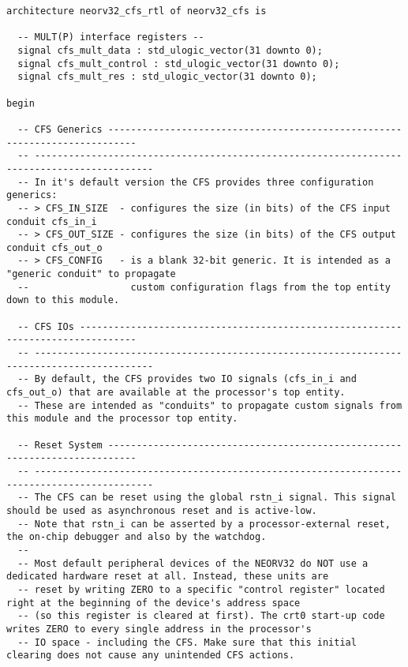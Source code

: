 \begin{code}
\begin{verbatim}
architecture neorv32_cfs_rtl of neorv32_cfs is

  -- MULT(P) interface registers --
  signal cfs_mult_data : std_ulogic_vector(31 downto 0);
  signal cfs_mult_control : std_ulogic_vector(31 downto 0);
  signal cfs_mult_res : std_ulogic_vector(31 downto 0);

begin

  -- CFS Generics ---------------------------------------------------------------------------
  -- -------------------------------------------------------------------------------------------
  -- In it's default version the CFS provides three configuration generics:
  -- > CFS_IN_SIZE  - configures the size (in bits) of the CFS input conduit cfs_in_i
  -- > CFS_OUT_SIZE - configures the size (in bits) of the CFS output conduit cfs_out_o
  -- > CFS_CONFIG   - is a blank 32-bit generic. It is intended as a "generic conduit" to propagate
  --                  custom configuration flags from the top entity down to this module.

  -- CFS IOs --------------------------------------------------------------------------------
  -- -------------------------------------------------------------------------------------------
  -- By default, the CFS provides two IO signals (cfs_in_i and cfs_out_o) that are available at the processor's top entity.
  -- These are intended as "conduits" to propagate custom signals from this module and the processor top entity.

  -- Reset System ---------------------------------------------------------------------------
  -- -------------------------------------------------------------------------------------------
  -- The CFS can be reset using the global rstn_i signal. This signal should be used as asynchronous reset and is active-low.
  -- Note that rstn_i can be asserted by a processor-external reset, the on-chip debugger and also by the watchdog.
  --
  -- Most default peripheral devices of the NEORV32 do NOT use a dedicated hardware reset at all. Instead, these units are
  -- reset by writing ZERO to a specific "control register" located right at the beginning of the device's address space
  -- (so this register is cleared at first). The crt0 start-up code writes ZERO to every single address in the processor's
  -- IO space - including the CFS. Make sure that this initial clearing does not cause any unintended CFS actions.



\end{verbatim}
\end{code}
